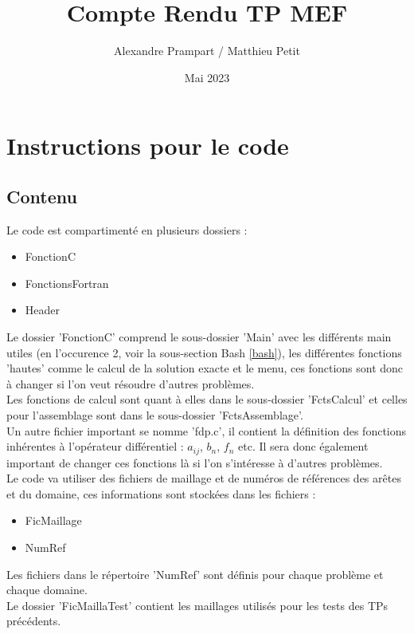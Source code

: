 \documentclass[a4paper, 12pt, french]{report}
\title{Compte Rendu TP MEF}
\author{Alexandre Prampart / Matthieu Petit}
\date{Mai 2023}
\begin{document}
\baselineskip=20pt

\maketitle

\tableofcontents
\newpage
\section{Instructions pour le code }

\subsection{Contenu}

Le code est compartimenté en plusieurs dossiers : 
\begin{itemize}
    \item FonctionC
    \item FonctionsFortran
    \item Header
\end{itemize}
Le dossier 'FonctionC' comprend le sous-dossier 'Main' avec les différents main utiles (en l'occurence 2, voir la sous-section Bash \ref{bash}), les différentes fonctions 'hautes' comme le calcul de la solution exacte et le menu, ces fonctions sont donc à changer si l'on veut résoudre d'autres problèmes.\\
Les fonctions de calcul sont quant à elles dans le sous-dossier 'FctsCalcul' et celles pour l'assemblage sont dans le sous-dossier 'FctsAssemblage'. \\
Un autre fichier important se nomme 'fdp.c', il contient la définition des fonctions inhérentes à l'opérateur différentiel : $a_{ij}$, $b_n$, $f_n$ etc. Il sera donc également important de changer ces fonctions là si l'on s'intéresse à d'autres problèmes.\\

Le code va utiliser des fichiers de maillage et de numéros de références des arêtes et du domaine, ces informations sont stockées dans les fichiers : 
\begin{itemize}
    \item FicMaillage
    \item NumRef
\end{itemize}
Les fichiers dans le répertoire 'NumRef' sont définis pour chaque problème et chaque domaine.\\
Le dossier 'FicMaillaTest' contient les maillages utilisés pour les tests des TPs précédents.\\
\end{document}
